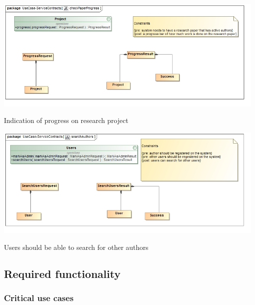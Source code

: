 \documentclass[a4paper,12pt]{report}
\begin{document}
\begin{flushleft}
	\includegraphics[scale=0.5]{./images/class__checkPaperProgress.jpg}
	\begin{center}
		Indication of progress on research project
	\end{center}
\end{flushleft}

\newpage

\begin{flushleft}
	\includegraphics[scale=0.5]{./images/class__searchAuthors.jpg}
	\begin{center}
		Users should be able to search for other authors
	\end{center}
\end{flushleft}

\newpage

\subsection{Required functionality}
\subsubsection{Critical use cases}
\end{document}
